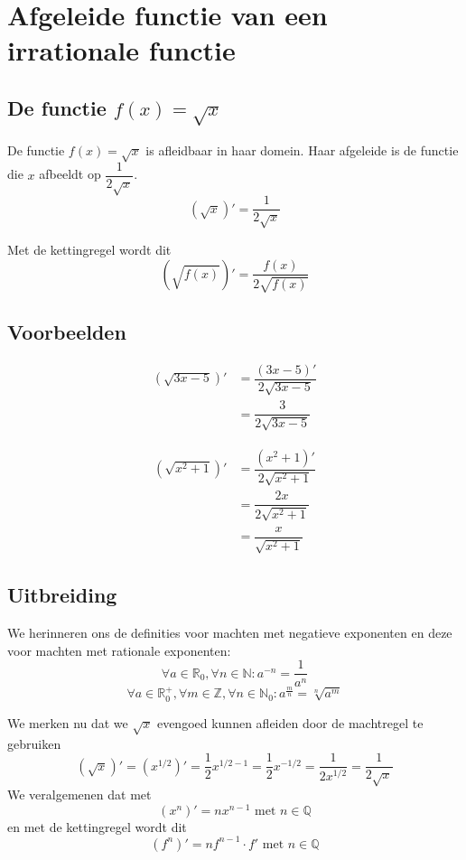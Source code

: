 \documentclass[12pt]{article}
\begin{document}
\pagebreak
\section{Afgeleide functie van een irrationale functie}

\begin{theorie}

\subsection{De functie $f(x)=\sqrt{x}$}

De functie $f(x)=\sqrt{x}$ is afleidbaar in haar domein. Haar afgeleide is de functie die $x$ afbeeldt op $\dfrac{1}{2\sqrt{x}}$.
$$\left(\sqrt{x}\right)'=\dfrac{1}{2\sqrt{x}}$$

Met de kettingregel wordt dit
$$\left(\sqrt{f(x)}\right)'=\dfrac{f(x)}{2\sqrt{f(x)}}$$

\subsection{Voorbeelden}
\begin{minipage}{0.5\textwidth}
\begin{align*}
\left(\sqrt{3x-5}\right)' &= \dfrac{(3x-5)'}{2\sqrt{3x-5}}\\
                          &= \dfrac{3}{2\sqrt{3x-5}}
\end{align*}
\end{minipage}
\begin{minipage}{0.5\textwidth}
\begin{align*}
\left(\sqrt{x^2+1}\right)' &= \dfrac{(x^2+1)'}{2\sqrt{x^2+1}}\\
                           &= \dfrac{2x}{2\sqrt{x^2+1}}\\
                           &= \dfrac{x}{\sqrt{x^2+1}}
\end{align*}
\end{minipage}

\subsection{Uitbreiding}
We herinneren ons de definities voor machten met negatieve exponenten en deze voor machten met rationale exponenten:
$$\forall a\in\mathbb{R}_0, \forall n\in\mathbb{N} : a^{-n}=\dfrac{1}{a^n}$$
$$\forall a\in\mathbb{R}_0^+, \forall m\in\mathbb{Z}, \forall n\in\mathbb{N}_0 : a^{\frac{m}{n}}=\sqrt[n]{a^m}$$

We merken nu dat we $\sqrt{x}$ evengoed kunnen afleiden door de machtregel te gebruiken
$$
  \left(\sqrt{x}\right)' = \left(x^{1/2}\right)'
                         = \frac{1}{2}x^{1/2-1}
                         = \frac{1}{2}x^{-1/2}
                         = \frac{1}{2x^{1/2}}
                         = \frac{1}{2\sqrt{x}}
$$
We veralgemenen dat met
$$\left(x^n\right)'=nx^{n-1} \mbox{ met } n\in\mathbb{Q}$$
en met de kettingregel wordt dit
$$\left(f^n\right)'=nf^{n-1}\cdot f' \mbox{ met } n\in\mathbb{Q}$$


\end{theorie}
\end{document}
